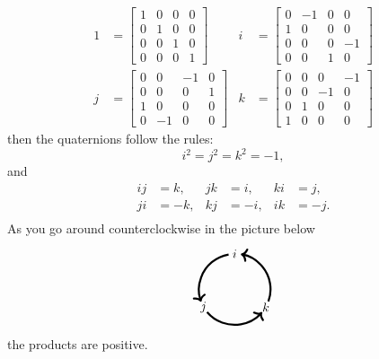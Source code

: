\documentclass{ximera}
\begin{document}
\begin{align*}
  1 &=
  \begin{bmatrix}
    1 & 0 & 0 & 0 \\
    0 & 1 & 0 & 0 \\
    0 & 0 & 1 & 0 \\
    0 & 0 & 0 & 1
  \end{bmatrix}
  &
i &=
\begin{bmatrix}
  0 & -1 & 0 &  0 \\
  1 &  0 & 0 &  0 \\
  0 &  0 & 0 & -1 \\
  0 &  0 & 1 &  0
\end{bmatrix} \\
j &=
\begin{bmatrix}
  0 &  0 & -1 &  0 \\
  0 &  0 &  0 &  1 \\
  1 &  0 &  0 &  0 \\
  0 & -1 &  0 &  0 
\end{bmatrix}
&
k &=
\begin{bmatrix}
  0 &  0 &  0 & -1 \\
  0 &  0 & -1 &  0 \\
  0 &  1 &  0 &  0 \\
  1 &  0 &  0 &  0 
\end{bmatrix}
\end{align*}
then the quaternions follow the rules:
\[
i^2 = j^2 = k^2 = -1,
\]
and
\begin{align*}
  ij &= k,  & jk &= i, & ki &= j, \\
  ji &= -k, & kj &= -i, & ik &= -j. \\
\end{align*}
As you go around counterclockwise in the picture below
\[
\begin{tikzpicture}
  \draw[ultra thick,->] (.94,-.34) arc (-20:80:1cm);
  \draw[ultra thick,->] (-.17,.98) arc (100:200:1cm);
  \draw[ultra thick,->] (-.77,-.64) arc (220:320:1cm);
  \node at (0,1) {$i$};
  \node at (-.87,-.5) {$j$};
  \node at (.87,-.5) {$k$};
\end{tikzpicture}
\]
the products are positive.
\end{document}
